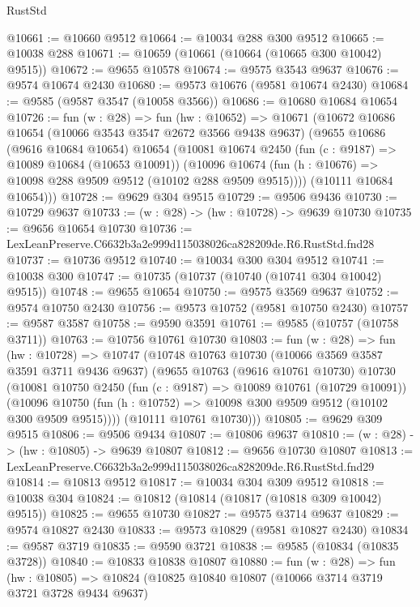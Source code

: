 \begin{lexlean}{RustStd}
\begin{coremodule}
@10661 := @10660 @9512
@10664 := @10034 @288 @300 @9512
@10665 := @10038 @288
@10671 := @10659 (@10661 (@10664 (@10665 @300 @10042) @9515))
@10672 := @9655 @10578
@10674 := @9575 @3543 @9637
@10676 := @9574 @10674 @2430
@10680 := @9573 @10676 (@9581 @10674 @2430)
@10684 := @9585 (@9587 @3547 (@10058 @3566))
@10686 := @10680 @10684 @10654
@10726 := fun (w : @28) =>
  fun (hw : @10652) =>
  @10671
    (@10672
      @10686
      @10654
      (@10066 @3543 @3547 @2672 @3566 @9438 @9637)
      (@9655
        @10686
        (@9616 @10684 @10654)
        @10654
        (@10081
          @10674
          @2450
          (fun (c : @9187) => @10089 @10684 (@10653 @10091))
          (@10096 @10674 (fun (h : @10676) => @10098 @288 @9509 @9512 (@10102 @288 @9509 @9515))))
        (@10111 @10684 @10654)))
@10728 := @9629 @304 @9515
@10729 := @9506 @9436
@10730 := @10729 @9637
@10733 := (w : @28) -> (hw : @10728) -> @9639 @10730
@10735 := @9656 @10654 @10730
@10736 := LexLeanPreserve.C6632b3a2e999d115038026ca828209de.R6.RustStd.fnd28
@10737 := @10736 @9512
@10740 := @10034 @300 @304 @9512
@10741 := @10038 @300
@10747 := @10735 (@10737 (@10740 (@10741 @304 @10042) @9515))
@10748 := @9655 @10654
@10750 := @9575 @3569 @9637
@10752 := @9574 @10750 @2430
@10756 := @9573 @10752 (@9581 @10750 @2430)
@10757 := @9587 @3587
@10758 := @9590 @3591
@10761 := @9585 (@10757 (@10758 @3711))
@10763 := @10756 @10761 @10730
@10803 := fun (w : @28) =>
  fun (hw : @10728) =>
  @10747
    (@10748
      @10763
      @10730
      (@10066 @3569 @3587 @3591 @3711 @9436 @9637)
      (@9655
        @10763
        (@9616 @10761 @10730)
        @10730
        (@10081
          @10750
          @2450
          (fun (c : @9187) => @10089 @10761 (@10729 @10091))
          (@10096 @10750 (fun (h : @10752) => @10098 @300 @9509 @9512 (@10102 @300 @9509 @9515))))
        (@10111 @10761 @10730)))
@10805 := @9629 @309 @9515
@10806 := @9506 @9434
@10807 := @10806 @9637
@10810 := (w : @28) -> (hw : @10805) -> @9639 @10807
@10812 := @9656 @10730 @10807
@10813 := LexLeanPreserve.C6632b3a2e999d115038026ca828209de.R6.RustStd.fnd29
@10814 := @10813 @9512
@10817 := @10034 @304 @309 @9512
@10818 := @10038 @304
@10824 := @10812 (@10814 (@10817 (@10818 @309 @10042) @9515))
@10825 := @9655 @10730
@10827 := @9575 @3714 @9637
@10829 := @9574 @10827 @2430
@10833 := @9573 @10829 (@9581 @10827 @2430)
@10834 := @9587 @3719
@10835 := @9590 @3721
@10838 := @9585 (@10834 (@10835 @3728))
@10840 := @10833 @10838 @10807
@10880 := fun (w : @28) =>
  fun (hw : @10805) =>
  @10824
    (@10825
      @10840
      @10807
      (@10066 @3714 @3719 @3721 @3728 @9434 @9637)

\end{coremodule}
\end{lexlean}
